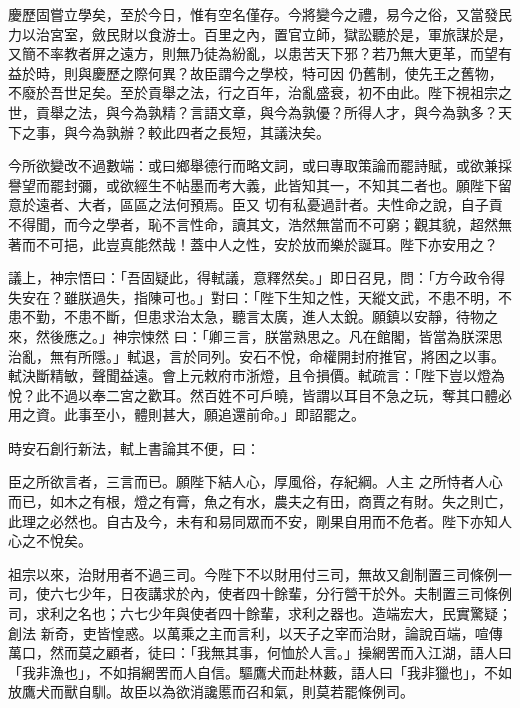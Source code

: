 \begin{pinyinscope}
 慶歷固嘗立學矣，至於今日，惟有空名僅存。今將變今之禮，易今之俗，又當發民力以治宮室，斂民財以食游士。百里之內，置官立師，獄訟聽於是，軍旅謀於是，又簡不率教者屏之遠方，則無乃徒為紛亂，以患苦天下邪？若乃無大更革，而望有益於時，則與慶歷之際何異？故臣謂今之學校，特可因
 仍舊制，使先王之舊物，不廢於吾世足矣。至於貢舉之法，行之百年，治亂盛衰，初不由此。陛下視祖宗之世，貢舉之法，與今為孰精？言語文章，與今為孰優？所得人才，與今為孰多？天下之事，與今為孰辦？較此四者之長短，其議決矣。



 今所欲變改不過數端：或曰鄉舉德行而略文詞，或曰專取策論而罷詩賦，或欲兼採譽望而罷封彌，或欲經生不帖墨而考大義，此皆知其一，不知其二者也。願陛下留意於遠者、大者，區區之法何預焉。臣又
 切有私憂過計者。夫性命之說，自子貢不得聞，而今之學者，恥不言性命，讀其文，浩然無當而不可窮；觀其貌，超然無著而不可挹，此豈真能然哉！蓋中人之性，安於放而樂於誕耳。陛下亦安用之？



 議上，神宗悟曰：「吾固疑此，得軾議，意釋然矣。」即日召見，問：「方今政令得失安在？雖朕過失，指陳可也。」對曰：「陛下生知之性，天縱文武，不患不明，不患不勤，不患不斷，但患求治太急，聽言太廣，進人太銳。願鎮以安靜，待物之來，然後應之。」神宗悚然
 曰：「卿三言，朕當熟思之。凡在館閣，皆當為朕深思治亂，無有所隱。」軾退，言於同列。安石不悅，命權開封府推官，將困之以事。軾決斷精敏，聲聞益遠。會上元敕府市浙燈，且令損價。軾疏言：「陛下豈以燈為悅？此不過以奉二宮之歡耳。然百姓不可戶曉，皆謂以耳目不急之玩，奪其口體必用之資。此事至小，體則甚大，願追還前命。」即詔罷之。



 時安石創行新法，軾上書論其不便，曰：



 臣之所欲言者，三言而已。願陛下結人心，厚風俗，存紀綱。人主
 之所恃者人心而已，如木之有根，燈之有膏，魚之有水，農夫之有田，商賈之有財。失之則亡，此理之必然也。自古及今，未有和易同眾而不安，剛果自用而不危者。陛下亦知人心之不悅矣。



 祖宗以來，治財用者不過三司。今陛下不以財用付三司，無故又創制置三司條例一司，使六七少年，日夜講求於內，使者四十餘輩，分行營干於外。夫制置三司條例司，求利之名也；六七少年與使者四十餘輩，求利之器也。造端宏大，民實驚疑；創法
 新奇，吏皆惶惑。以萬乘之主而言利，以天子之宰而治財，論說百端，喧傳萬口，然而莫之顧者，徒曰：「我無其事，何恤於人言。」操網罟而入江湖，語人曰「我非漁也」，不如捐網罟而人自信。驅鷹犬而赴林藪，語人曰「我非獵也」，不如放鷹犬而獸自馴。故臣以為欲消讒慝而召和氣，則莫若罷條例司。




\end{pinyinscope}
